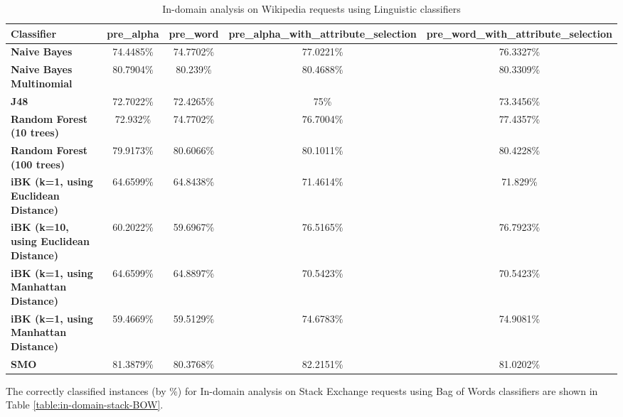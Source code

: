 \documentclass[conference]{IEEEtran}
\begin{document}
\begin{table*}[htbp]
\caption{In-domain analysis on Wikipedia requests using Linguistic classifiers }
\centering
\vspace{5pt}
\begin{tabular}{|l|c|c|c|c|}
\hline
\textbf{Classifier} & \textbf{pre\_alpha} & \textbf{pre\_word} & \textbf{pre\_alpha\_with\_attribute\_selection} & \textbf{pre\_word\_with\_attribute\_selection} \\
\hline\hline
\textbf{Naive Bayes} & 74.4485\% & 74.7702\% & 77.0221\% & 76.3327\% \\ 
\hline
\textbf{Naive Bayes Multinomial} & 80.7904\% & 80.239\% & 80.4688\% & 80.3309\% \\ 
\hline
\textbf{J48} & 72.7022\% & 72.4265\% & 75\% & 73.3456\% \\ 
\hline
\textbf{Random Forest (10 trees)} & 72.932\% & 74.7702\% & 76.7004\% & 77.4357\% \\ 
\hline
\textbf{Random Forest (100 trees)} & 79.9173\% & 80.6066\% & 80.1011\% & 80.4228\% \\ 
\hline
\textbf{iBK (k=1, using Euclidean Distance)} & 64.6599\% & 64.8438\% & 71.4614\% & 71.829\% \\ 
\hline
\textbf{iBK (k=10, using Euclidean Distance)} & 60.2022\% & 59.6967\% & 76.5165\% & 76.7923\% \\ 
\hline
\textbf{iBK (k=1, using Manhattan Distance)} & 64.6599\% & 64.8897\% & 70.5423\% & 70.5423\% \\ 
\hline
\textbf{iBK (k=1, using Manhattan Distance)} & 59.4669\% & 59.5129\% & 74.6783\% & 74.9081\% \\ 
\hline
\textbf{SMO} & 81.3879\% & 80.3768\% & 82.2151\% & 81.0202\% \\ 
\hline
\hline
\end{tabular}
\label{table:in-domain-wiki-Ling}
\end{table*}

The correctly classified instances (by \%) for In-domain analysis on Stack Exchange requests using Bag of Words classifiers are shown in Table \ref{table:in-domain-stack-BOW}.
\end{document}
